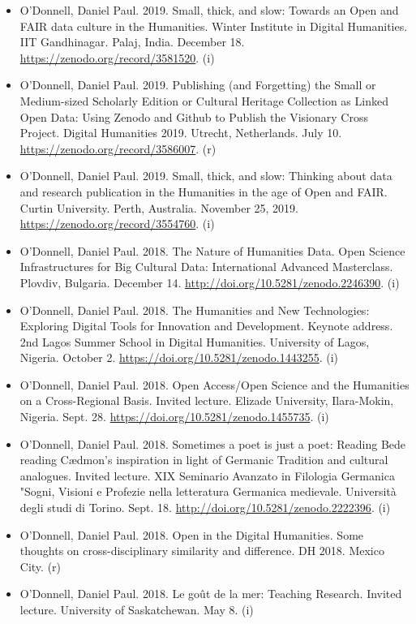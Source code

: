 \documentclass[12pt]{article}
\begin{document}
\begin{itemize}
  \item O’Donnell, Daniel Paul. 2019. Small, thick, and slow: Towards an Open and FAIR data culture in the Humanities. Winter Institute in Digital Humanities. IIT Gandhinagar. Palaj, India. December 18. \url{https://zenodo.org/record/3581520}. (i)
  \item O’Donnell, Daniel Paul. 2019. Publishing (and Forgetting) the Small or Medium-sized Scholarly Edition or Cultural Heritage Collection as Linked Open Data: Using Zenodo and Github to Publish the Visionary Cross Project. Digital Humanities 2019. Utrecht, Netherlands. July 10. \url{https://zenodo.org/record/3586007}. (r)
  \item O’Donnell, Daniel Paul. 2019. Small, thick, and slow: Thinking about data and research publication in the Humanities in the age of Open and FAIR. Curtin University. Perth, Australia. November 25, 2019. \url{https://zenodo.org/record/3554760}. (i)
  \item O’Donnell, Daniel Paul. 2018. The Nature of Humanities Data. Open Science Infrastructures for Big Cultural Data: International Advanced Masterclass. Plovdiv, Bulgaria. December 14. \url{http://doi.org/10.5281/zenodo.2246390}. (i)
  \item O’Donnell, Daniel Paul. 2018. The Humanities and New Technologies: Exploring Digital Tools for Innovation and Development. Keynote address. 2nd Lagos Summer School in Digital Humanities. University of Lagos, Nigeria. October 2. \url{https://doi.org/10.5281/zenodo.1443255}. (i)
  \item O’Donnell, Daniel Paul. 2018. Open Access/Open Science and the Humanities on a Cross-Regional Basis. Invited lecture. Elizade University, Ilara-Mokin, Nigeria. Sept. 28. \url{https://doi.org/10.5281/zenodo.1455735}. (i)
  \item O’Donnell, Daniel Paul. 2018. Sometimes a poet is just a poet: Reading Bede reading Cædmon’s inspiration in light of Germanic Tradition and cultural analogues. Invited lecture. XIX Seminario Avanzato in Filologia Germanica "Sogni, Visioni e Profezie nella letteratura Germanica medievale. Università degli studi di Torino. Sept. 18. \url{http://doi.org/10.5281/zenodo.2222396}. (i)
  \item O’Donnell, Daniel Paul. 2018. Open in the Digital Humanities. Some thoughts on cross-disciplinary similarity and difference. DH 2018. Mexico City. (r)
  \item O’Donnell, Daniel Paul. 2018. Le goût de la mer: Teaching Research. Invited lecture. University of Saskatchewan. May 8. (i)

\end{itemize}
\end{document}

